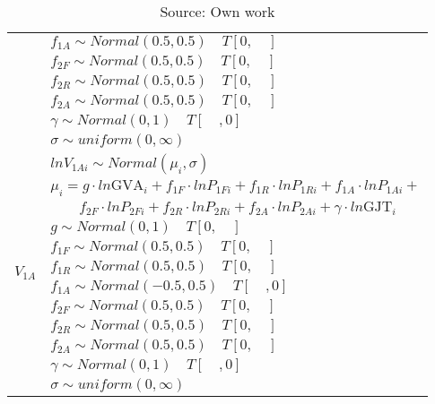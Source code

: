 \begin{table}[!ht]
\begin{tabular} {ll}
                          &$f_{1A} \sim Normal (0.5,0.5) \quad T[0,\quad]$\\
                          &$f_{2F} \sim Normal (0.5,0.5) \quad T[0,\quad]$\\
                          &$f_{2R} \sim Normal (0.5,0.5) \quad T[0,\quad]$\\
                          &$f_{2A} \sim Normal (0.5,0.5) \quad T[0,\quad]$\\
                          &$\gamma \sim Normal (0,1)  \quad T[\quad,0]$\\
                          &$\sigma \sim uniform(0,\infty) $\\ 
\hline
\multirow{12}{*}{$V_{1A}$}&$lnV_{1Ai} \sim Normal(\mu_i, \sigma) $ \\
                          &$\mu_i = g \cdot ln \text{GVA}_i + f_{1F} \cdot lnP_{1Fi} + f_{1R} \cdot lnP_{1Ri} + f_{1A} \cdot lnP_{1Ai} +$\\
                          &$\quad \quad f_{2F} \cdot lnP_{2Fi} + f_{2R} \cdot lnP_{2Ri} + f_{2A} \cdot lnP_{2Ai} + \gamma \cdot ln\text{GJT}_i$ \\
                          &$g \sim Normal (0,1) \quad T[0,\quad]$\\
                          &$f_{1F} \sim Normal (0.5,0.5) \quad T[0,\quad]$\\
                          &$f_{1R} \sim Normal (0.5,0.5) \quad T[0,\quad]$\\
                          &$f_{1A} \sim Normal (-0.5,0.5) \quad T[\quad,0]$\\
                          &$f_{2F} \sim Normal (0.5,0.5) \quad T[0,\quad]$\\
                          &$f_{2R} \sim Normal (0.5,0.5) \quad T[0,\quad]$\\
                          &$f_{2A} \sim Normal (0.5,0.5) \quad T[0,\quad]$\\
                          &$\gamma \sim Normal (0,1)  \quad T[\quad,0]$\\
                          &$\sigma \sim uniform(0,\infty) $\\ 
\bottomrule
\end{tabular}%
\caption*{Source: Own work}
\end{table} 
